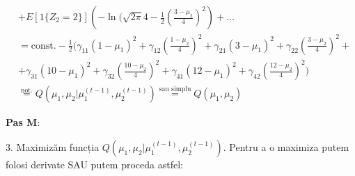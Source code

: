 \documentclass[12pt]{article}
\begin{document}
\begin{enumerate}
\begin{align*}
		&+E[1\{Z_2 = 2\}] \left(-\ln(\sqrt{2\pi }4 - \frac{1}{2} \left(\frac{3 - \mu_2}{4}\right)^2\right) + \dots\\
		&= \text{const.} - \frac{1}{2} (
		\gamma_{11} (1-\mu_1)^2 + 
		\gamma_{12} \left(\frac{1-\mu_2}{4}\right)^2 + 
		\gamma_{21} (3-\mu_1)^2 + 
		\gamma_{22} \left(\frac{3-\mu_2}{4}\right)^2 + \\
		&+\gamma_{31} (10-\mu_1)^2 + 
		\gamma_{32} \left(\frac{10-\mu_2}{4}\right)^2 + 
		\gamma_{41} (12-\mu_1)^2 + 
		\gamma_{42} \left(\frac{12-\mu_2}{4}\right)^2
		)\\
		&\stackrel{\text{not.}}{=} Q(\mu_1,\mu_2|\mu_1^{(t-1)},\mu_2^{(t-1)}) \stackrel{\text{sau simplu}}{=} Q(\mu_1,\mu_2)
		\end{align*}
		
		\textbf{Pas M}:
		
		3. Maximizăm funcția $Q(\mu_1,\mu_2|\mu_1^{(t-1)},\mu_2^{(t-1)})$. Pentru a o maximiza putem folosi derivate SAU putem proceda astfel:
		

\end{enumerate}
\end{document}
